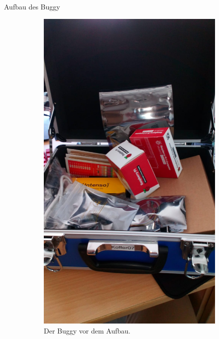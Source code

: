 \documentclass[12pt,twoside]{report}
\begin{document}
\begin{section}{Aufbau des Buggy}

\begin{figure}[h!]
  \centering
  \captionsetup[subfigure]{labelformat=empty}
  \begin{subfigure}{0.45\linewidth}
    \includegraphics[width=\linewidth]{lernportfolio_assets/Buggy_Koffer.jpeg}
    \caption{Der Buggy vor dem Aufbau.}
  \end{subfigure}
  \begin{subfigure}{0.45\linewidth}

\end{subfigure}
\end{figure}
\end{section}
\end{document}
